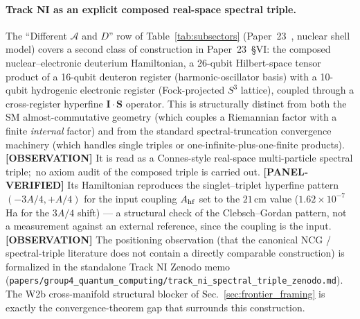 \documentclass[11pt]{article}
\begin{document}
\paragraph{Track NI as an explicit composed real-space spectral triple.}
The ``Different $\mathcal{A}$ and $D$'' row of
Table~\ref{tab:subsectors} (Paper~23~\cite{paper23}, nuclear shell
model) covers a second class of construction in Paper~23~\S VI: the
composed nuclear--electronic deuterium Hamiltonian, a 26-qubit
Hilbert-space tensor product of a 16-qubit deuteron register
(harmonic-oscillator basis) with a 10-qubit hydrogenic electronic
register (Fock-projected $S^3$ lattice), coupled through a
cross-register hyperfine $\mathbf{I}\cdot\mathbf{S}$ operator.  This
is structurally distinct from both the SM almost-commutative geometry
(which couples a Riemannian factor with a finite \emph{internal}
factor) and from the standard spectral-truncation convergence
machinery (which handles single triples or one-infinite-plus-one-finite
products).  \textbf{[OBSERVATION]} It is read as a Connes-style
real-space multi-particle spectral triple;\ no axiom audit of the
composed triple is carried out.  \textbf{[PANEL-VERIFIED]} Its
Hamiltonian reproduces the singlet--triplet hyperfine pattern
$(-3A/4, +A/4)$ for the input coupling $A_{\rm hf}$ set to the $21\,$cm
value ($1.62 \times 10^{-7}$ Ha for the $3A/4$ shift) --- a structural
check of the Clebsch--Gordan pattern, not a measurement against an
external reference, since the coupling is the input.
\textbf{[OBSERVATION]} The
positioning observation (that the canonical NCG / spectral-triple
literature does not contain a directly comparable construction) is
formalized in the standalone Track NI Zenodo memo
(\verb|papers/group4_quantum_computing/track_ni_spectral_triple_zenodo.md|).
The W2b cross-manifold structural blocker of
Sec.~\ref{sec:frontier_framing} is exactly the convergence-theorem
gap that surrounds this construction.
\end{document}
